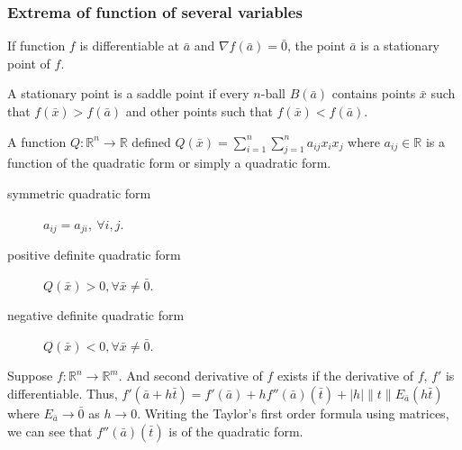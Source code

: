 \subsubsection{Extrema of function of several variables}
\begin{definition}
	If function $f$ is differentiable at $\bar{a}$ and $\nabla f(\bar{a}) = \bar{0}$, the point $\bar{a}$ is a stationary point of $f$.
\end{definition}

\begin{definition}
	A stationary point is a saddle point if every $n$-ball $B(\bar{a})$ contains points $\bar{x}$ such that $f(\bar{x}) > f(\bar{a})$ and other points such that $f(\bar{x}) < f(\bar{a})$.
\end{definition}

\begin{definition}
	A function $Q : \mathbb{R}^n \to \mathbb{R}$ defined $Q(\bar{x}) = \sum_{i=1}^n \sum_{j=1}^n a_{ij}x_ix_j$ where $a_{ij} \in \mathbb{R}$ is a function of the quadratic form or simply a quadratic form.
\begin{description}
	\item[symmetric quadratic form] $a_{ij} = a_{ji},\ \forall i,j$. 
	\item[positive definite quadratic form] $Q(\bar{x}) > 0, \forall \bar{x} \ne \bar{0}$. 
	\item[negative definite quadratic form] $Q(\bar{x}) < 0, \forall \bar{x} \ne \bar{0}$. 
\end{description}
\end{definition}

\begin{commentary}
	Suppose $f : \mathbb{R}^n \to \mathbb{R}^m$.
	And second derivative of $f$ exists if the derivative of $f$, $f'$ is differentiable.
	Thus, $f'(\bar{a}+h\bar{t}) = f'(\bar{a}) + h f''(\bar{a})(\bar{t}) + |h| \|t\| E_{\bar{a}}(h\bar{t})$ where $E_{\bar{a}} \to \bar{0}$ as $h \to 0$.
	Writing the Taylor's first order formula using matrices, we can see that $f''(\bar{a})(\bar{t})$ is of the quadratic form.
\end{commentary}

